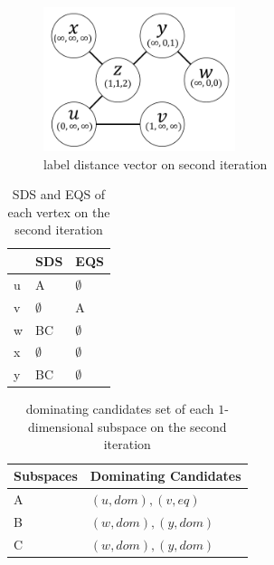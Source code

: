 \begin{figure}[H]
    \centering
    \includegraphics[width=0.5\textwidth]{figs/graph_example_2}
    \caption{\label{fig:cand_step2}label distance vector on second iteration}
    
\end{figure}

\begin{table}[H]
    \centering
    \begin{tabular}{|l|l|l|}
    \hline
      & SDS         & EQS         \\ \hline
    u & A           & $\emptyset$ \\ \hline
    v & $\emptyset$ & A           \\ \hline
    w & BC          & $\emptyset$ \\ \hline
    x & $\emptyset$ & $\emptyset$ \\ \hline
    y & BC          & $\emptyset$ \\ \hline
    \end{tabular}
    \caption{\label{tab:sds_step2}SDS and EQS of each vertex on the second iteration}
    
\end{table}

\begin{table}[H]
    \centering

    \begin{tabular}{|l|l|}
    \hline
    Subspaces & Dominating Candidates \\ \hline
    A         & $(u, dom), (v, eq)$            \\ \hline
    B         & $(w, dom), (y, dom)$            \\ \hline
    C         & $(w, dom), (y, dom)$            \\ \hline
    \end{tabular}
    \caption{\label{tab:cand_set_step2}dominating candidates set of each $1$-dimensional subspace on the second iteration}
    
\end{table}


